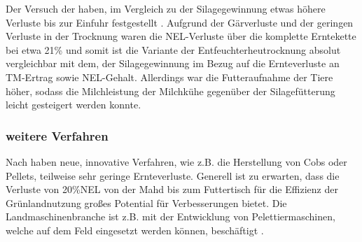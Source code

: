 %
%
Der Versuch der \HBLFA haben, im Vergleich zu der Silagegewinnung etwas höhere Verluste bis zur Einfuhr festgestellt \parencite{gruber2015einfluss}. 
Aufgrund der Gärverluste und der geringen Verluste in der Trocknung waren die \ac{NEL}-Verluste über die komplette Erntekette bei etwa 21\% und somit ist die Variante der Entfeuchterheutrocknung absolut vergleichbar mit dem, der Silagegewinnung \parencite[30]{fritz2018wirtschaftliche} im Bezug auf die Ernteverluste an \ac{TM}-Ertrag sowie \ac{NEL}-Gehalt.
Allerdings war die Futteraufnahme der Tiere höher, sodass die Milchleistung der Milchkühe gegenüber der Silagefütterung leicht gesteigert werden konnte.


\subsubsection{weitere Verfahren}
\label{subsub:Peletts}
Nach \textcite[12f]{engel2013protein} haben neue, innovative Verfahren, wie z.B. die Herstellung von Cobs oder Pellets, teilweise sehr geringe Ernteverluste.
Generell ist zu erwarten, dass die Verluste von 20\%\ac{NEL} von der Mahd bis zum Futtertisch für die Effizienz der Grünlandnutzung großes Potential für Verbesserungen bietet.
Die Landmaschinenbranche ist z.B. mit der Entwicklung von Pelettiermaschinen, welche auf dem Feld eingesetzt werden können, beschäftigt \parencite[9]{schrammcrop}.


